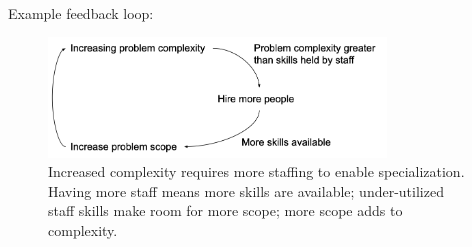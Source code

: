 \ \\

Example feedback loop:
\begin{center}
\begin{figure}[ht]
    \centering
    \includegraphics[width=0.8\textwidth]{images/feedback_loop_complexity_and_staffing}
    \caption{Increased complexity requires more staffing to enable specialization. Having more staff means more skills are available; under-utilized staff skills make room for more scope; more scope adds to complexity.}
    \label{fig:complexity_and_staff_growth}
\end{figure}
\end{center}

